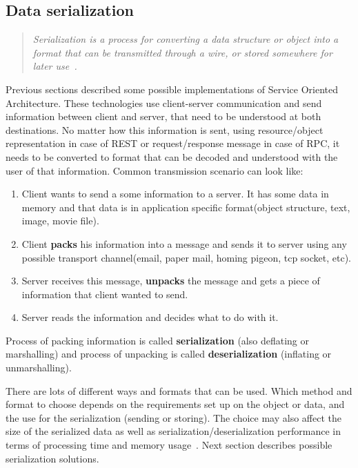 \subsection{Data serialization}
\begin{quotation}
\textit{
Serialization is a process for converting a data structure or object into a format that
can be transmitted through a wire, or stored somewhere for later
use~\cite{json_vs_yaml}.
}
\end{quotation}
Previous sections described some possible implementations of Service Oriented
Architecture. These technologies use client-server communication and
send information between client and server, that need to be understood at both
destinations. No matter how this information is sent, using resource/object representation in case of REST or
request/response message in case of RPC, it needs to be converted to format that
can be decoded and understood with the user of that information. Common transmission scenario
can look like:
\begin{enumerate}
  \item Client wants to send a some information to a server. It has some data in
  memory and that data is in application specific format(object structure, text,
  image, movie file).
  \item Client \textbf{packs} his information into a message and sends it to
  server using any possible transport channel(email, paper mail, homing pigeon, tcp
  socket, etc).
  \item Server receives this message, \textbf{unpacks} the message and gets a
  piece of information that client wanted to send.
  \item Server reads the information and decides what to do with it.
\end{enumerate}

Process of packing information is called \textbf{serialization} (also deflating
or marshalling) and process of unpacking is called \textbf{deserialization}
(inflating or unmarshalling). 

There are lots of different ways and formats that can
be used. Which method and format to choose depends on the requirements set up on
the object or data, and the use for the serialization (sending or storing). The choice
may also affect the size of the serialized data as well as serialization/deserialization
performance in terms of processing time and memory usage~\cite{json_vs_yaml}.
Next section describes possible serialization solutions.

